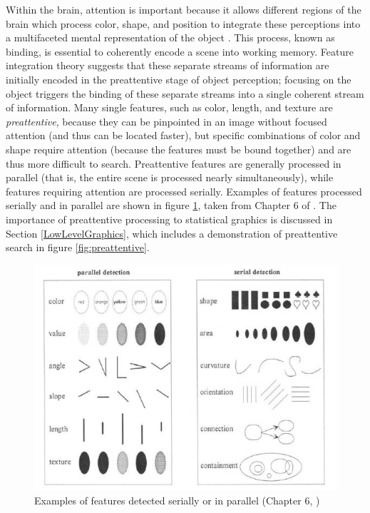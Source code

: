 \documentclass[11pt]{isuthesis}\usepackage[]{graphicx}\usepackage[]{color}
\begin{document}
Within the brain, attention is important because it allows different regions of the brain which process color, shape, and position to integrate these perceptions into a multifaceted mental representation of the object \citep{goldstein}. This process, known as binding, is essential to coherently encode a scene into working memory. Feature integration theory \citep{treisman1980feature} suggests that these separate streams of information are initially encoded in the preattentive stage of object perception; focusing on the object triggers the binding of these separate streams into a single coherent stream of information. Many single features, such as color, length, and texture are \emph{preattentive}, because they can be pinpointed in an image without focused attention (and thus can be located faster), but specific combinations of color and shape require attention (because the features must be bound together) and are thus more difficult to search. Preattentive features are generally processed in parallel (that is, the entire scene is processed nearly simultaneously), while features requiring attention are processed serially. Examples of features processed  serially and in parallel are shown in figure \ref{fig:parallelSerialFeatures}, taken from Chapter 6 of \citet{helander1997handbook}. The importance of preattentive processing to statistical graphics is discussed in Section \ref{LowLevelGraphics}, which includes a demonstration of preattentive search in figure \ref{fig:preattentive}. 

\begin{figure}[htbp]\centering
\includegraphics[width=.8\linewidth]{ParallelSerialFeatures}
\caption[Parallel and Serial Feature Detection]{Examples of features detected serially or in parallel (Chapter 6, \protect\citealt{helander1997handbook})}\label{fig:parallelSerialFeatures}
\end{figure}
\end{document}
